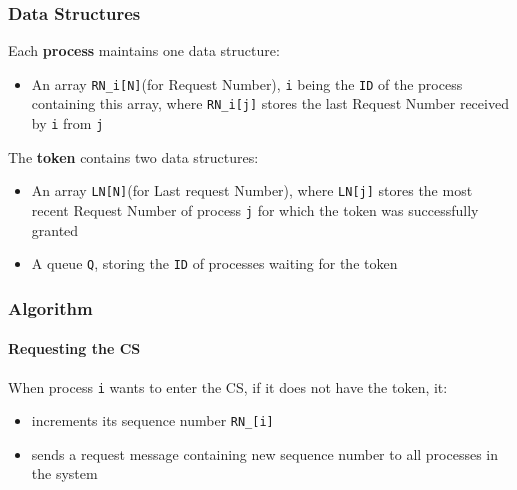
\subsubsection{Data Structures}
Each \textbf{process} maintains one data structure:
\begin{itemize}
   \item An array \lstinline|RN_i[N]|(for Request Number), \lstinline|i| being the \lstinline|ID| of the process containing this array, where \lstinline|RN_i[j]| stores the last Request Number received by \lstinline|i| from \lstinline|j|
\end{itemize}

The \textbf{token} contains two data
structures:
\begin{itemize}
	\item An array \lstinline|LN[N]|(for Last request Number), where \lstinline|LN[j]| stores the most recent Request Number of process \lstinline|j| for which the token was successfully granted
	\item A queue \lstinline|Q|, storing the \lstinline|ID| of processes waiting for the token
\end{itemize}

\subsubsection{Algorithm}
\paragraph*{Requesting the CS}
When process \lstinline|i| wants to enter the CS, if it does not have the token, it:
\begin{itemize}
	\item increments its sequence number \lstinline|RN_[i]|
	\item sends a request message containing new sequence number to all processes in the system
\end{itemize}

